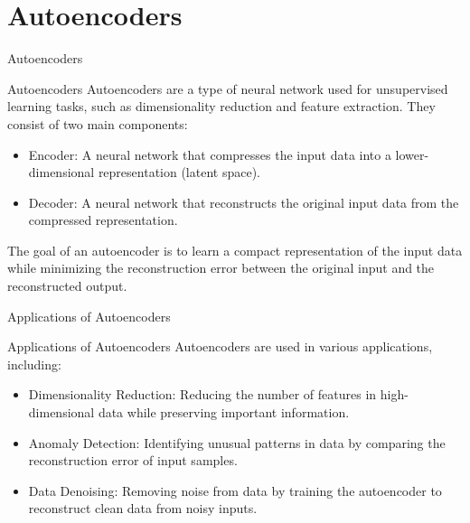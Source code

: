 \documentclass[hyperref={pdfpagelabels=false},aspectratio=169]{beamer}
\begin{document}
\section{Autoencoders}
\label{sec:orge0468f2}
\begin{frame}[label={sec:org6bb72c8}]{Autoencoders}
\begin{block}{Autoencoders}
Autoencoders are a type of neural network used for unsupervised learning tasks, such as dimensionality reduction and feature extraction. They consist of two main components:
\begin{itemize}
\item \alert{Encoder}: A neural network that compresses the input data into a lower-dimensional representation (latent space).
\item \alert{Decoder}: A neural network that reconstructs the original input data from the compressed representation.
\end{itemize}
The goal of an autoencoder is to learn a compact representation of the input data while minimizing the reconstruction error between the original input and the reconstructed output.
\end{block}
\end{frame}
\begin{frame}[label={sec:org271a9a6}]{Applications of Autoencoders}
\begin{block}{Applications of Autoencoders}
Autoencoders are used in various applications, including:
\begin{itemize}
\item \alert{Dimensionality Reduction}: Reducing the number of features in high-dimensional data while preserving important information.
\item \alert{Anomaly Detection}: Identifying unusual patterns in data by comparing the reconstruction error of input samples.
\item \alert{Data Denoising}: Removing noise from data by training the autoencoder to reconstruct clean data from noisy inputs.
\end{itemize}
\end{block}
\end{frame}
\end{document}
